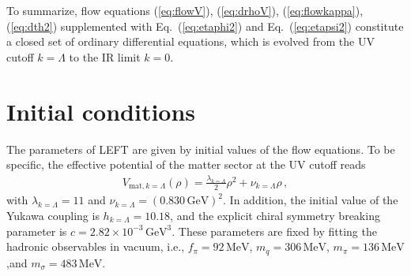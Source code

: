 \documentclass[%
reprint,
superscriptaddress,
showpacs,preprintnumbers,
amsmath,amssymb,
aps,
prd,
]{revtex4-1}
\def\Eq#1{Eq.~(\ref{#1})}
\begin{document}
To summarize, flow equations (\ref{eq:flowV}), (\ref{eq:drhoV}), (\ref{eq:flowkappa}), (\ref{eq:dth2}) supplemented with \Eq{eq:etaphi2} and \Eq{eq:etapsi2} constitute a closed set of ordinary differential equations, which is evolved from the UV cutoff $k=\Lambda$ to the IR limit $k=0$. 
	
\section{Initial conditions}
\label{app:Ini}
	
The parameters of LEFT are given by initial values of the flow equations. To be specific, the effective potential of the matter sector at the UV cutoff reads
%
\begin{align}
V_{\mathrm{mat}, k=\Lambda}(\rho)=\frac{\lambda_{k=\Lambda}}{2}\rho^2+\nu_{k=\Lambda}\rho\,,
\end{align}
%
with $\lambda_{k=\Lambda}=11$ and $\nu_{k=\Lambda}=(0.830\,\mathrm{GeV})^2$. In addition, the initial value of the Yukawa coupling is $h_{k=\Lambda}=10.18$, and the explicit chiral symmetry breaking parameter is $c=2.82\times 10^{-3}\,\mathrm{GeV}^3$. These parameters are fixed by fitting the hadronic observables in vacuum, i.e., $f_\pi=92\,\mathrm{MeV}$, $m_q=306\,\mathrm{MeV}$, $m_\pi=136\,\mathrm{MeV}$,and $m_\sigma=483\,\mathrm{MeV}$.
	
\end{document}
